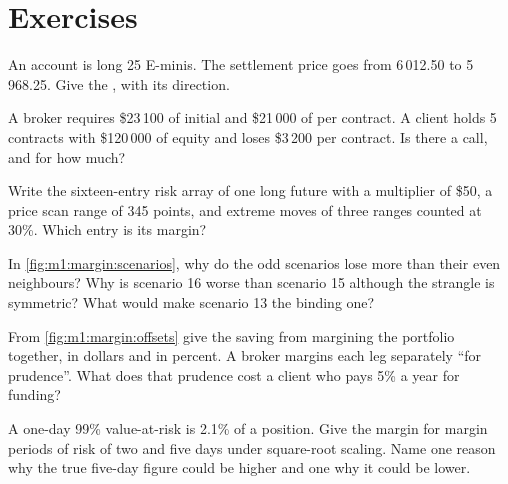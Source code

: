 \section{Exercises}

\begin{exercise}[$\star$]\label{exo:m1:margin:1}
An account is long 25 E-minis. The settlement price goes from 6\,012.50 to
5\,968.25. Give the , with its direction.
\end{exercise}

\begin{exercise}[$\star$]\label{exo:m1:margin:2}
A broker requires \$23\,100 of initial and \$21\,000 of  per
contract. A client holds 5 contracts with \$120\,000 of equity and loses
\$3\,200 per contract. Is there a call, and for how much?
\end{exercise}

\begin{exercise}[$\star$]\label{exo:m1:margin:3}
Write the sixteen-entry risk array of one long future with a multiplier of
\$50, a price scan range of 345 points, and extreme moves of three ranges
counted at 30\%. Which entry is its margin?
\end{exercise}

\begin{exercise}[$\star\star$]\label{exo:m1:margin:4}
In \cref{fig:m1:margin:scenarios}, why do the odd scenarios lose more than
their even neighbours? Why is scenario 16 worse than scenario 15 although the
strangle is symmetric? What would make scenario 13 the binding one?
\end{exercise}

\begin{exercise}[$\star\star$]\label{exo:m1:margin:5}
From \cref{fig:m1:margin:offsets} give the saving from margining the
portfolio together, in dollars and in percent. A broker margins each leg
separately ``for prudence''. What does that prudence cost a client who pays
5\% a year for funding?
\end{exercise}

\begin{exercise}[$\star\star$]\label{exo:m1:margin:6}
A one-day 99\% value-at-risk is 2.1\% of a position. Give the margin for
margin periods of risk of two and five days under square-root scaling. Name
one reason why the true five-day figure could be higher and one why it could
be lower.
\end{exercise}

